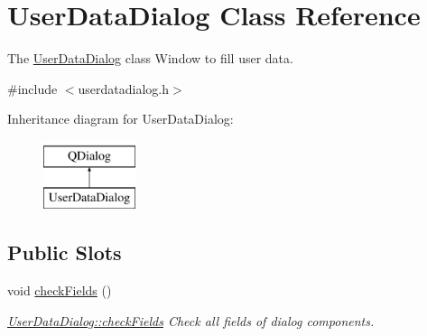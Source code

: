 \hypertarget{classUserDataDialog}{\section{User\+Data\+Dialog Class Reference}
\label{classUserDataDialog}
}


The \hyperlink{classUserDataDialog}{User\+Data\+Dialog} class Window to fill user data.  




{\ttfamily \#include $<$userdatadialog.\+h$>$}

Inheritance diagram for User\+Data\+Dialog\+:\begin{figure}[H]
\begin{center}
\leavevmode
\includegraphics[height=2.000000cm]{de/d9c/classUserDataDialog}
\end{center}
\end{figure}
\subsection*{Public Slots}
\begin{DoxyCompactItemize}
\item 
\hypertarget{classUserDataDialog_a3ec2568b8b70aaf531585da0dc26f3de}{void \hyperlink{classUserDataDialog_a3ec2568b8b70aaf531585da0dc26f3de}{check\+Fields} ()}\label{classUserDataDialog_a3ec2568b8b70aaf531585da0dc26f3de}

\begin{DoxyCompactList}\small\item\em \hyperlink{classUserDataDialog_a3ec2568b8b70aaf531585da0dc26f3de}{User\+Data\+Dialog\+::check\+Fields} Check all fields of dialog components. \end{DoxyCompactList}\end{DoxyCompactItemize}
